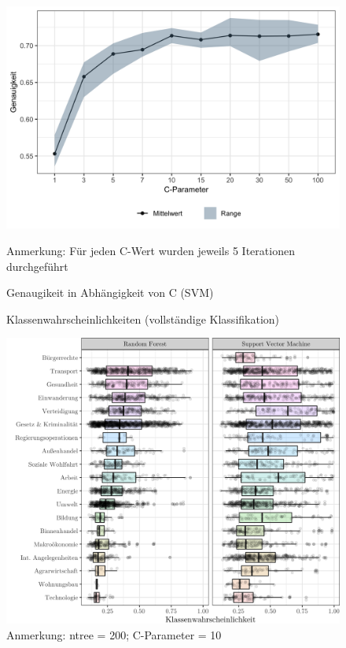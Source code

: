 \begin{figure}[!h]
	\caption{Genaugikeit in Abhängigkeit von C (SVM)}
	\label{c_values}
	\centering
	\includegraphics[width=\textwidth]{images/c_values.png}
	\flushright
	{\scriptsize Anmerkung: Für jeden C-Wert wurden jeweils 5 Iterationen durchgeführt \par}
\end{figure}

\begin{figure}[!h]
	\caption{Klassenwahrscheinlichkeiten (vollständige Klassifikation)}
	\label{probs_real}
	\centering
	\includegraphics[width=\textwidth]{images/prob_boxplot_real_mod_2.png}
	\caption*{\scriptsize Anmerkung: ntree = 200; C-Parameter = 10}
\end{figure}

